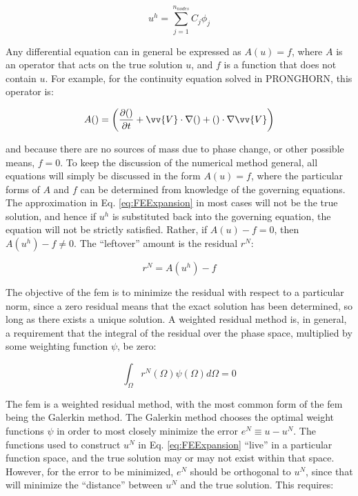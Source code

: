 \documentclass[10pt]{article}
\numberwithin{equation}{section} %
\begin{document}
\begin{equation}
\label{eq:FEExpansion}
u^h=\sum_{j=1}^{n_{nodes}} C_j\phi_j
\end{equation}

Any differential equation can in general be expressed as \(A(u)=f\), where \(A\) is an operator that acts on the true solution \(u\), and \(f\) is a function that does not contain \(u\). For example, for the continuity equation solved in PRONGHORN, this operator is:

\begin{equation}
A( )=\left(\frac{\partial( )}{\partial t}+\vv{V}\cdot\nabla( )+( )\cdot\nabla\vv{V}\right)
\end{equation}

and because there are no sources of mass due to phase change, or other possible means, \(f=0\). To keep the discussion of the numerical method general, all equations will simply be discussed in the form \(A(u)=f\), where the particular forms of \(A\) and \(f\) can be determined from knowledge of the governing equations. The approximation in Eq. \eqref{eq:FEExpansion} in most cases will not be the true solution, and hence if \(u^h\) is substituted back into the governing equation, the equation will not be strictly satisfied. Rather, if \(A(u)-f=0\), then \(A(u^h)-f\neq0\). The ``leftover'' amount is the residual \(r^N\):

\begin{equation}
\label{eq:residual}
r^N=A(u^h)-f
\end{equation}

The objective of the \gls{fem} is to minimize the residual with respect to a particular norm, since a zero residual means that the exact solution has been determined, so long as there exists a unique solution. A weighted residual method is, in general, a requirement that the integral of the residual over the phase space, multiplied by some weighting function \(\psi\), be zero:

\begin{equation}
\int_\Omega r^N(\Omega)\psi(\Omega)d\Omega=0
\end{equation}

The \gls{fem} is a weighted residual method, with the most common form of the \gls{fem} being the Galerkin method. The Galerkin method chooses the optimal weight functions \(\psi\) in order to most closely minimize the error \(e^N\equiv u-u^N\). The functions used to construct \(u^N\) in Eq. \eqref{eq:FEExpansion} ``live'' in a particular function space, and the true solution may or may not exist within that space. However, for the error to be minimized, \(e^N\) should be orthogonal to \(u^N\), since that will minimize the ``distance'' between \(u^N\) and the true solution. This requires:
\end{document}
